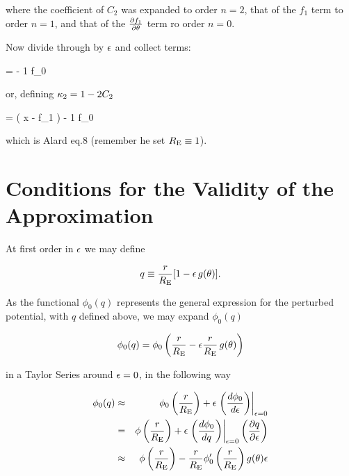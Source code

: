 where the coefficient of $C_2$ was expanded to order $n=2$, that of
the $f_1$ term to order $n=1$, and that of the $\partial f_1 \over \partial
\theta$ term ro order $n=0$.  



Now divide through by $\epsilon$ and collect terms:

\beq
 \vecy = \left[ (1-2 C_2) x -  f_1 \right]  - {1 \over \re} {\prtl f_0
\over \prtl \te} \hat{\theta}
\eeq

or, defining $\kappa_2 = 1-2 C_2$

\beq
\label{eq:rsexpanded}
\vecy = ( \kt x - f_1 )  - {1 \over \re} {\prtl f_0 \over \prtl \te} 
\hat{\theta}
\eeq

which is Alard eq.8 (remember he set $R_{\mathrm{E}} \equiv 1$).


\section{Conditions for the Validity of the Approximation}

At first order in $\epsilon$ we may define

\begin{equation}
 q \equiv \frac{r}{R_{\mathrm{E}}}[1-\epsilon\,g(\theta)].
\end{equation}

As the functional $\phi_0(q)$ represents the general expression
for the perturbed potential, with $q$ defined above, we may expand $\phi_0(q)$

\begin{displaymath}
 \phi_0(q)=\phi_0\left(\dfrac{r}{R_{\mathrm{E}}}-\epsilon\dfrac{r}{R_{\mathrm{E}}}\,g(\theta)\right)
\end{displaymath}

\noindent in a Taylor Series around $\epsilon=0$, in the following way

\def\dpdq{ \left. \left( \frac{d\phi_0}{dq}\right) \right|_{\eps=0} }
\def\dpde{ \left. \left( \frac{d\phi_0}{d\eps}\right) \right|_{\eps=0} }

\begin{eqnarray}
 \phi_0(q) &\approx& \phi_0\prre+\eps \dpde \\
	  & = & \phi\prre+\eps \dpdq  \left(\frac{\prtl q}{\prtl \eps}\right)\\
	  &\approx& \phi\prre-\rre\phi_0^\prime\prre g(\te)\eps \label{key1}
\end{eqnarray}

